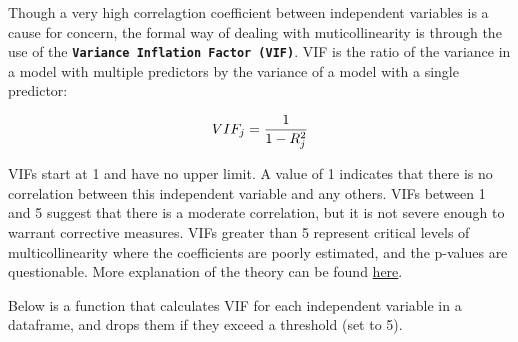 \documentclass[
  letterpaper,
  DIV=11,
  numbers=noendperiod]{scrreprt}
\begin{document}
Though a very high correlagtion coefficient between independent
variables is a cause for concern, the formal way of dealing with
muticollinearity is through the use of the
\textbf{\texttt{Variance\ Inflation\ Factor\ (VIF)}}. VIF is the ratio
of the variance in a model with multiple predictors by the variance of a
model with a single predictor:

\[\large VIF_j=\frac{1}{1-R_{j}^{2}}\]

VIFs start at 1 and have no upper limit. A value of 1 indicates that
there is no correlation between this independent variable and any
others. VIFs between 1 and 5 suggest that there is a moderate
correlation, but it is not severe enough to warrant corrective measures.
VIFs greater than 5 represent critical levels of multicollinearity where
the coefficients are poorly estimated, and the p-values are
questionable. More explanation of the theory can be found
\href{https://en.wikipedia.org/wiki/Variance_inflation_factor}{here}.

Below is a function that calculates VIF for each independent variable in
a dataframe, and drops them if they exceed a threshold (set to 5).
\end{document}
